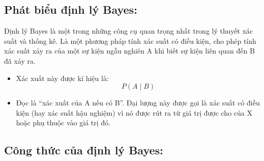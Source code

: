 \subsection{Phát biểu định lý Bayes:}

Định lý Bayes là một trong những công cụ quan trọng nhất trong lý thuyết xác suất và thống kê. Là một phương pháp tính xác suất có điều kiện, cho phép tính xác suất xảy ra của một sự kiện ngẫu nghiên A khi biết sự kiện liên quan đến B đã xảy ra.

\begin{itemize}
    \item Xác xuất này được kí hiệu là:
     \[P(A \mid B)\]
    \item Đọc là “xác xuất của A nếu có B”. Đại lượng này được gọi là xác suất có điều kiện (hay xác suất hậu nghiệm) vì nó được rút ra từ giá trị được cho của X hoặc phụ thuộc vào giá trị đó.
\end{itemize}
	
\subsection{Công thức của định lý Bayes:}

